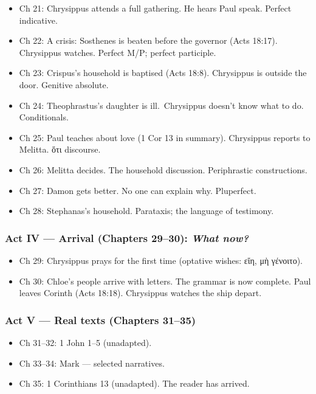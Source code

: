 \documentclass[a4paper]{report}
\begin{document}
\begin{itemize}
\tightlist
\item
  Ch 21: Chrysippus attends a full gathering. He hears Paul speak.
  Perfect indicative.
\item
  Ch 22: A crisis: Sosthenes is beaten before the governor (Acts 18:17).
  Chrysippus watches. Perfect M/P; perfect participle.
\item
  Ch 23: Crispus's household is baptised (Acts 18:8). Chrysippus is
  outside the door. Genitive absolute.
\item
  Ch 24: Theophrastus's daughter is ill.~Chrysippus doesn't know what to
  do. Conditionals.
\item
  Ch 25: Paul teaches about love (1 Cor 13 in summary). Chrysippus
  reports to Melitta. ὅτι discourse.
\item
  Ch 26: Melitta decides. The household discussion. Periphrastic
  constructions.
\item
  Ch 27: Damon gets better. No one can explain why. Pluperfect.
\item
  Ch 28: Stephanas's household. Parataxis; the language of testimony.
\end{itemize}

\subsubsection{\texorpdfstring{Act IV --- Arrival (Chapters 29--30):
\emph{What
now?}}{Act IV --- Arrival (Chapters 29--30): What now?}}\label{act-iv-arrival-chapters-2930-what-now}

\begin{itemize}
\tightlist
\item
  Ch 29: Chrysippus prays for the first time (optative wishes: εἴη, μὴ
  γένοιτο).
\item
  Ch 30: Chloe's people arrive with letters. The grammar is now
  complete. Paul leaves Corinth (Acts 18:18). Chrysippus watches the
  ship depart.
\end{itemize}

\subsubsection{Act V --- Real texts (Chapters
31--35)}\label{act-v-real-texts-chapters-3135}

\begin{itemize}
\tightlist
\item
  Ch 31--32: 1 John 1--5 (unadapted).
\item
  Ch 33--34: Mark --- selected narratives.
\item
  Ch 35: 1 Corinthians 13 (unadapted). The reader has arrived.
\end{itemize}
\end{document}
